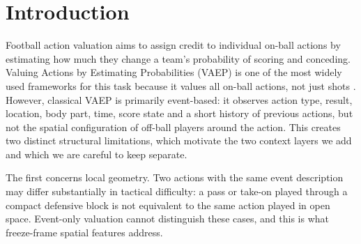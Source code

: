 \documentclass[runningheads]{llncs}
\begin{document}
\section{Introduction}
Football action valuation aims to assign credit to individual on-ball actions by estimating how much they change a team's probability of scoring and conceding. Valuing Actions by Estimating Probabilities (VAEP) is one of the most widely used frameworks for this task because it values all on-ball actions, not just shots \cite{decroos2019actions}. However, classical VAEP is primarily event-based: it observes action type, result, location, body part, time, score state and a short history of previous actions, but not the spatial configuration of off-ball players around the action.
This creates two distinct structural limitations, which motivate the two context layers we add and which we are careful to keep separate.

The first concerns local geometry. Two actions with the same event description may differ substantially in tactical difficulty: a pass or take-on played through a compact defensive block is not equivalent to the same action played in open space. Event-only valuation cannot distinguish these cases, and this is what freeze-frame spatial features address.
\end{document}
